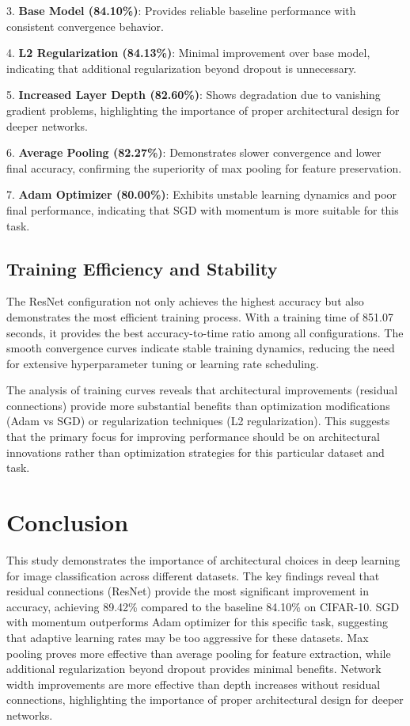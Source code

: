 \documentclass{article}
\begin{document}
3. \textbf{Base Model (84.10\%)}: Provides reliable baseline performance with consistent convergence behavior.

4. \textbf{L2 Regularization (84.13\%)}: Minimal improvement over base model, indicating that additional regularization beyond dropout is unnecessary.

5. \textbf{Increased Layer Depth (82.60\%)}: Shows degradation due to vanishing gradient problems, highlighting the importance of proper architectural design for deeper networks.

6. \textbf{Average Pooling (82.27\%)}: Demonstrates slower convergence and lower final accuracy, confirming the superiority of max pooling for feature preservation.

7. \textbf{Adam Optimizer (80.00\%)}: Exhibits unstable learning dynamics and poor final performance, indicating that SGD with momentum is more suitable for this task.

\subsection{Training Efficiency and Stability}

The ResNet configuration not only achieves the highest accuracy but also demonstrates the most efficient training process. With a training time of 851.07 seconds, it provides the best accuracy-to-time ratio among all configurations. The smooth convergence curves indicate stable training dynamics, reducing the need for extensive hyperparameter tuning or learning rate scheduling.

The analysis of training curves reveals that architectural improvements (residual connections) provide more substantial benefits than optimization modifications (Adam vs SGD) or regularization techniques (L2 regularization). This suggests that the primary focus for improving performance should be on architectural innovations rather than optimization strategies for this particular dataset and task.

\section{Conclusion}

This study demonstrates the importance of architectural choices in deep learning for image classification across different datasets. The key findings reveal that residual connections (ResNet) provide the most significant improvement in accuracy, achieving 89.42\% compared to the baseline 84.10\% on CIFAR-10. SGD with momentum outperforms Adam optimizer for this specific task, suggesting that adaptive learning rates may be too aggressive for these datasets. Max pooling proves more effective than average pooling for feature extraction, while additional regularization beyond dropout provides minimal benefits. Network width improvements are more effective than depth increases without residual connections, highlighting the importance of proper architectural design for deeper networks.
\end{document}
